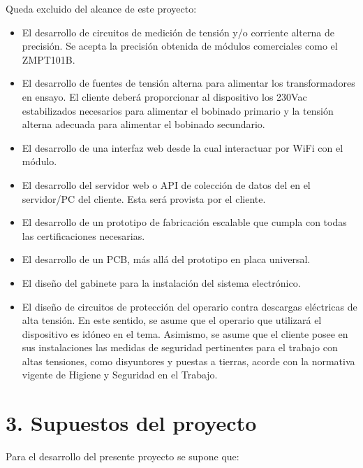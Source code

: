 \documentclass[11pt]{charter}
\begin{document}
Queda excluido del alcance de este proyecto:
\begin{itemize}
\item El desarrollo de circuitos de medición de tensión y/o corriente alterna de precisión. Se acepta la precisión obtenida de módulos comerciales como el ZMPT101B.
\item El desarrollo de fuentes de tensión alterna para alimentar los transformadores en ensayo. El cliente deberá proporcionar al dispositivo los 230Vac estabilizados necesarios para alimentar el bobinado primario y la tensión alterna adecuada para alimentar el bobinado secundario.
\item El desarrollo de una interfaz web desde la cual interactuar por WiFi con el módulo.
\item El desarrollo del servidor web o API de colección de datos del en el servidor/PC del cliente. Esta será provista por el cliente.
\item El desarrollo de un prototipo de fabricación escalable que cumpla con todas las certificaciones necesarias.
\item El desarrollo de un PCB, más allá del prototipo en placa universal.
\item El diseño del gabinete para la instalación del sistema electrónico.
\item El diseño de circuitos de protección del operario contra descargas eléctricas de alta tensión. En este sentido, se asume que el operario que utilizará el dispositivo es idóneo en el tema. Asimismo, se asume que el cliente posee en sus instalaciones las medidas de seguridad pertinentes para el trabajo con altas tensiones, como disyuntores y puestas a tierras, acorde con la normativa vigente de Higiene y Seguridad en el Trabajo.
\end{itemize}

\section{3. Supuestos del proyecto}
\label{sec:supuestos}


Para el desarrollo del presente proyecto se supone que:
\end{document}
